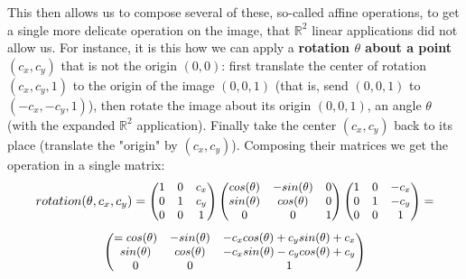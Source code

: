 \documentclass[11pt, a4paper, twoside]{article} %
\newcommand{\R}{\mathbb{R}} %
\begin{document}
{This then allows us to compose several of these, so-called affine operations, to get a single more delicate operation on the image, that $\R^2$ linear applications did not allow us. For instance, it is this how we can apply a {\bf rotation $\theta$ about a point $(c_x,c_y)$} that is not the origin $(0,0)$: first translate the center of rotation $(c_x,c_y,1)$ to the origin of the image $(0,0,1)$ (that is, send $(0,0,1)$ to $(-c_x,-c_y,1)$), then rotate the image about its origin $(0,0,1)$, an angle $\theta$ (with the expanded $\R^2$ application). Finally take the center $(c_x,c_y)$ back to its place (translate the "origin" by $(c_x,c_y)$). Composing their matrices we get the operation in a single matrix:
\begin{equation}\small
rotation(\theta, c_x,c_y) = \begin{pmatrix}
1 & 0 & c_x\\
0 & 1 & c_y\\
0 & 0 & 1
\end{pmatrix}\begin{pmatrix}
cos(\theta) & -sin(\theta) & 0\\
sin(\theta) & cos(\theta) & 0\\
0 & 0 & 1
\end{pmatrix}\begin{pmatrix}
1 & 0 & -c_x\\
0 & 1 & -c_y\\
0 & 0 & 1
\end{pmatrix}=
\end{equation}
\begin{equation}
\small\begin{pmatrix}
=cos(\theta) & -sin(\theta) & -c_xcos(\theta)+c_ysin(\theta)+c_x\\
sin(\theta) & cos(\theta) & -c_xsin(\theta)-c_ycos(\theta)+c_y\\
0 & 0 & 1
\end{pmatrix}
\end{equation}
}
\end{document}
